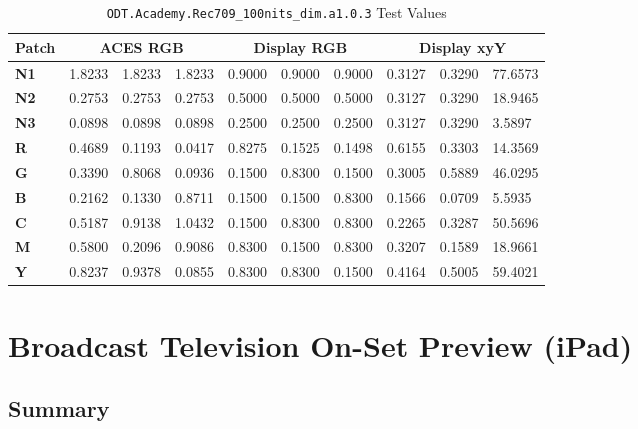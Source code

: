 \begin{table}[ht!]
    \centering
    \begin{tabular}{|l|l|l|l|l|l|l|l|l|l|}
        \hline
        \multicolumn{1}{|c|}{\textbf{Patch}} & \multicolumn{3}{c|}{\textbf{ACES RGB}} & \multicolumn{3}{c|}{\textbf{Display RGB}} & \multicolumn{3}{c|}{\textbf{Display xyY}} \\ \hline
        \textbf{N1} & 1.8233 & 1.8233 & 1.8233 & 0.9000 & 0.9000 & 0.9000 & 0.3127 & 0.3290 & 77.6573 \\ \hline
        \textbf{N2} & 0.2753 & 0.2753 & 0.2753 & 0.5000 & 0.5000 & 0.5000 & 0.3127 & 0.3290 & 18.9465 \\ \hline
        \textbf{N3} & 0.0898 & 0.0898 & 0.0898 & 0.2500 & 0.2500 & 0.2500 & 0.3127 & 0.3290 & 3.5897  \\ \hline
        \textbf{R}  & 0.4689 & 0.1193 & 0.0417 & 0.8275 & 0.1525 & 0.1498 & 0.6155 & 0.3303 & 14.3569 \\ \hline
        \textbf{G}  & 0.3390 & 0.8068 & 0.0936 & 0.1500 & 0.8300 & 0.1500 & 0.3005 & 0.5889 & 46.0295 \\ \hline
        \textbf{B}  & 0.2162 & 0.1330 & 0.8711 & 0.1500 & 0.1500 & 0.8300 & 0.1566 & 0.0709 & 5.5935  \\ \hline
        \textbf{C}  & 0.5187 & 0.9138 & 1.0432 & 0.1500 & 0.8300 & 0.8300 & 0.2265 & 0.3287 & 50.5696 \\ \hline
        \textbf{M}  & 0.5800 & 0.2096 & 0.9086 & 0.8300 & 0.1500 & 0.8300 & 0.3207 & 0.1589 & 18.9661 \\ \hline
        \textbf{Y}  & 0.8237 & 0.9378 & 0.0855 & 0.8300 & 0.8300 & 0.1500 & 0.4164 & 0.5005 & 59.4021 \\ \hline
    \end{tabular}
    \caption[Broadcast Television On-Set Preview - Test Values]{ \texttt{ODT.Academy.Rec709\_100nits\_dim.a1.0.3} Test Values}
    \label{tab:testValues-rec709onset}
\end{table}

\clearpage
\section{Broadcast Television On-Set Preview (iPad)}
\label{sec:ot-app-iPad-d60}

\subsection{Summary}
\label{subsec:summary-iPad-d60}

